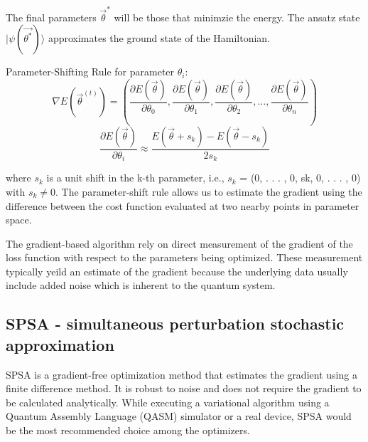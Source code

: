 \documentclass{article}
\begin{document}
The final parameters \(\vec{\theta}^*\) will be those that minimzie the energy. The ansatz state \(|\psi(\vec{\theta^*})\rangle\) approximates the ground state of the Hamiltonian.

Parameter-Shifting Rule for parameter \(\theta_i\):
\[\nabla E(\vec{\theta}^{(t)}) = \left(\frac{\partial E(\vec{\theta})}{\partial\theta_0},\frac{\partial E(\vec{\theta})}{\partial\theta_1},\frac{\partial E(\vec{\theta})}{\partial\theta_2},\dots,\frac{\partial E(\vec{\theta})}{\partial\theta_n}\right)\]
\[\frac{\partial E(\vec{\theta})}{\partial\theta_i} \approx \frac{E\left(\vec{\theta} + s_k\right) - E\left(\vec{\theta} - s_k\right)}{2s_k}\]

where \(s_k\) is a  unit shift in the k-th parameter, i.e., \(s_k\) = (0, . . . , 0, sk, 0, . . . , 0) with  \(s_k \neq 0\). The parameter-shift rule allows us to estimate the gradient using the difference between the cost function evaluated at two nearby points in parameter space.


The gradient-based algorithm rely on direct measurement of the gradient of the loss function with respect to the parameters being optimized. These measurement 
typically yeild an estimate of the gradient because the underlying data usually include added noise which is inherent to the quantum system.
\subsection*{SPSA - simultaneous perturbation stochastic approximation}

SPSA is a gradient-free optimization method that 
estimates the gradient using a finite difference method. 
It is robust to noise and does not require the gradient to be calculated analytically. While executing a variational algorithm using a Quantum Assembly Language (QASM)
simulator or a real device, SPSA would be the most recommended choice among the optimizers.
\end{document}
